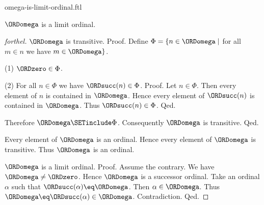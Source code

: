 \documentclass{naproche-library}
\begin{document}
\begin{smodule}[title=$\omega$ is a Limit Ordinal]{omega-is-limit-ordinal.ftl}

\begin{proposition}[forthel,id=SET_THEORY_03_764451995254784]
  $\ORDomega$ is a limit ordinal.
\end{proposition}
\begin{proof}[forthel]
  $\ORDomega$ is transitive. \newline
  Proof.
    Define $\Phi = \{ n \in \ORDomega \mid$ for all $m \in n$ we have $m \in \ORDomega \}$.

    (1) $\ORDzero \in \Phi$.

    (2) For all $n \in \Phi$ we have $\ORDsucc(n) \in \Phi$. \newline
    Proof.
      Let $n \in \Phi$.
      Then every element of $n$ is contained in $\ORDomega$.
      Hence every element of $\ORDsucc(n)$ is contained in $\ORDomega$.
      Thus $\ORDsucc(n) \in \Phi$.
    Qed.

    Therefore $\ORDomega \SETinclude \Phi$.
    Consequently $\ORDomega$ is transitive.
  Qed.

  Every element of $\ORDomega$ is an ordinal.
  Hence every element of $\ORDomega$ is transitive.
  Thus $\ORDomega$ is an ordinal.

  $\ORDomega$ is a limit ordinal. \newline
  Proof.
    Assume the contrary.
    We have $\ORDomega \neq \ORDzero$.
    Hence $\ORDomega$ is a successor ordinal.
    Take an ordinal $\alpha$ such that $\ORDsucc(\alpha) \eq \ORDomega$.
    Then $\alpha \in \ORDomega$.
    Thus $\ORDomega \eq \ORDsucc(\alpha) \in \ORDomega$.
    Contradiction.
  Qed.
\end{proof}
\end{smodule}
\end{document}
